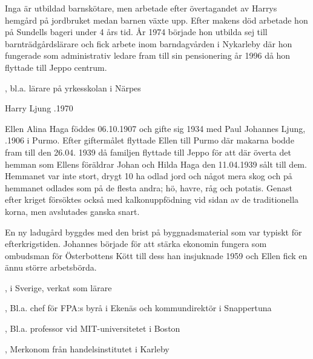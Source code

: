Inga är utbildad barnskötare, men arbetade efter övertagandet av Harrys hemgård på jordbruket medan barnen växte upp. Efter makens död arbetade hon på Sundells bageri under 4 års tid. År 1974 började hon utbilda sej till barnträdgårdslärare och fick arbete inom barndagvården i Nykarleby där hon fungerade som administrativ ledare fram till sin pensionering år 1996 då hon flyttade till Jeppo centrum.

\begin{jhchildren}
  \item {}
  \item {}, bl.a. lärare på yrkesskolan i Närpes
  \item {}
\end{jhchildren}

Harry Ljung .1970



Ellen Alina Haga föddes 06.10.1907 och gifte sig  1934 med Paul Johannes Ljung, .1906 i Purmo. Efter giftermålet flyttade Ellen till Purmo där makarna bodde fram till den 26.04. 1939 då familjen flyttade till Jeppo för att där överta det hemman som Ellens föräldrar Johan och Hilda Haga den 11.04.1939 sålt till dem. Hemmanet var inte stort, drygt 10 ha odlad jord och något mera skog och på hemmanet odlades som på de flesta andra; hö, havre, råg och potatis. Genast efter kriget försöktes också med kalkonuppfödning vid sidan av de traditionella korna, men avslutades ganska snart.

En ny ladugård byggdes med den brist på byggnadsmaterial som var typiskt för efterkrigstiden. Johannes började för att stärka ekonomin fungera som ombudsman för Österbottens Kött till dess han insjuknade 1959 och Ellen fick en ännu större arbetsbörda.

\begin{jhchildren}
  \item {}
  \item {}, i Sverige, verkat som lärare
  \item {}, Bl.a. chef för FPA:s byrå i Ekenäs och kommundirektör i Snappertuna
  \item {}, Bl.a. professor vid MIT-universitetet i Boston
  \item {}, Merkonom från handelsinstitutet i Karleby
\end{jhchildren}


